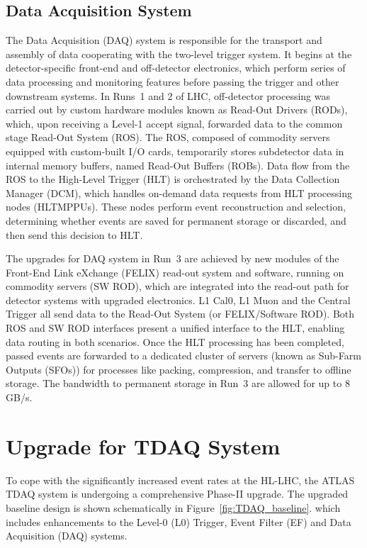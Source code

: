 \subsection{Data Acquisition System}
The Data Acquisition (DAQ) system is responsible for the transport and assembly of data cooperating with the two-level trigger system. It begins at the detector-specific front-end and off-detector electronics, which perform series of data processing and monitoring features before passing the trigger and other downstream systems. In Runs~1 and 2 of LHC, off-detector processing was carried out by custom hardware modules known as Read-Out Drivers (RODs), which, upon receiving a Level-1 accept signal, forwarded data to the common stage Read-Out System (ROS). The ROS, composed of commodity servers equipped with custom-built I/O cards, temporarily stores subdetector data in internal memory buffers, named Read-Out Buffers (ROBs). Data flow from the ROS to the High-Level Trigger (HLT) is orchestrated by the Data Collection Manager (DCM), which handles on-demand data requests from HLT processing nodes (HLTMPPUs). These nodes perform event reconstruction and selection, determining whether events are saved for permanent storage or discarded, and then send this decision to HLT. 

The upgrades for DAQ system in Run~3 are achieved by new modules of the Front-End Link eXchange (FELIX) read-out system and software, running on commodity servers (SW ROD), which are integrated into the read-out path for detector systems with upgraded electronics. L1 Cal0, L1 Muon and the Central Trigger all send data to the Read-Out System (or FELIX/Software ROD). Both ROS and SW ROD interfaces present a unified interface to the HLT, enabling data routing in both scenarios. Once the HLT processing has been completed, passed events are forwarded to a dedicated cluster of servers (known as Sub-Farm Outputs (SFOs)) for processes like packing, compression, and transfer to offline storage. The bandwidth to permanent storage in Run~3 are allowed for up to 8 GB/s.

\section{Upgrade for TDAQ System} \label{sec:TDAQUpgrade}
To cope with the significantly increased event rates at the HL-LHC, the ATLAS TDAQ system is undergoing a comprehensive Phase-II upgrade. The upgraded baseline design is shown schematically in Figure~\ref{fig:TDAQ_baseline}. which includes enhancements to the Level-0 (L0) Trigger, Event Filter (EF) and Data Acquisition (DAQ) systems.

